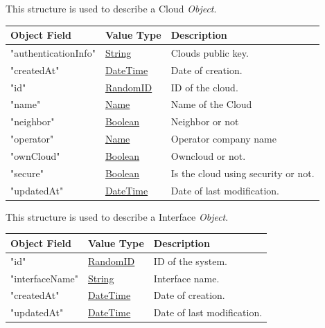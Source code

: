 \documentclass[a4paper]{arrowhead}
\newcommand{\pref}[1]{{\textcolor{ArrowheadGrey}{\hyperref[sec:model:primitives:#1]{#1}}}}
\begin{document}

This structure is used to describe a Cloud \textit{Object}.

\begin{table}[ht!]
\begin{tabularx}{\textwidth}{| p{5cm} | p{3.5cm} | X |} \hline
\rowcolor{gray!33} Object Field & Value Type      & Description \\ \hline
"authenticationInfo"  & \pref{String}     & Clouds public key. \\ \hline
"createdAt"           & \pref{DateTime}   & Date of creation. \\ \hline
"id"                  & \pref{RandomID}   & ID of the cloud. \\ \hline
"name"                & \pref{Name}       & Name of the Cloud \\ \hline
"neighbor"            & \pref{Boolean}    & Neighbor or not \\ \hline
"operator"            & \pref{Name}       & Operator company name \\ \hline
"ownCloud"            & \pref{Boolean}    & Owncloud or not. \\ \hline
"secure"              & \pref{Boolean}    & Is the cloud using security or not. \\ \hline
"updatedAt"           & \pref{DateTime}   & Date of last modification. \\ \hline

\end{tabularx}
\end{table}


This structure is used to describe a Interface \textit{Object}.

\begin{table}[ht!]
\begin{tabularx}{\textwidth}{| p{5cm} | p{3.5cm} | X |} \hline
\rowcolor{gray!33} Object Field & Value Type      & Description \\ \hline
"id"                  & \pref{RandomID}   & ID of the system. \\ \hline
"interfaceName"          & \pref{String}       & Interface name. \\ \hline
"createdAt"           & \pref{DateTime}   & Date of creation. \\ \hline
"updatedAt"           & \pref{DateTime}   & Date of last modification. \\ \hline


\end{tabularx}
\end{table}
\end{document}
